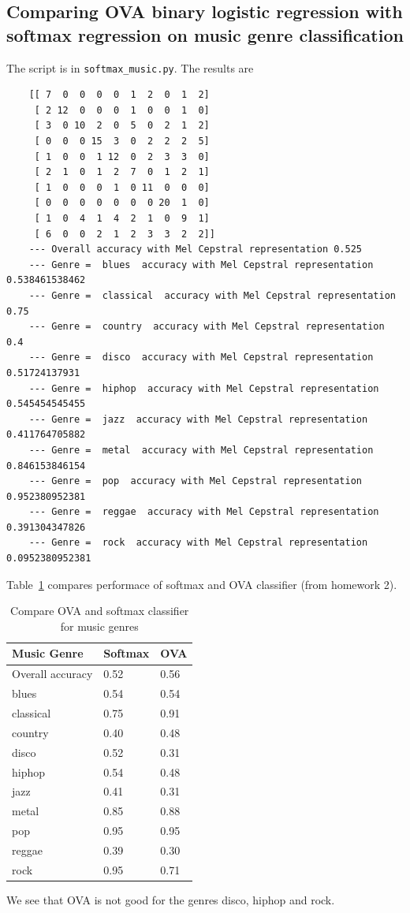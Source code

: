 \documentclass{article}
\begin{document}
\subsection{Comparing OVA binary logistic regression with softmax regression on music genre classification}
The script is in \verb|softmax_music.py|. The results are
\begin{lstlisting}
	[[ 7  0  0  0  0  1  2  0  1  2]
	 [ 2 12  0  0  0  1  0  0  1  0]
	 [ 3  0 10  2  0  5  0  2  1  2]
	 [ 0  0  0 15  3  0  2  2  2  5]
	 [ 1  0  0  1 12  0  2  3  3  0]
	 [ 2  1  0  1  2  7  0  1  2  1]
	 [ 1  0  0  0  1  0 11  0  0  0]
	 [ 0  0  0  0  0  0  0 20  1  0]
	 [ 1  0  4  1  4  2  1  0  9  1]
	 [ 6  0  0  2  1  2  3  3  2  2]]
	--- Overall accuracy with Mel Cepstral representation 0.525
	--- Genre =  blues  accuracy with Mel Cepstral representation 0.538461538462
	--- Genre =  classical  accuracy with Mel Cepstral representation 0.75
	--- Genre =  country  accuracy with Mel Cepstral representation 0.4
	--- Genre =  disco  accuracy with Mel Cepstral representation 0.51724137931
	--- Genre =  hiphop  accuracy with Mel Cepstral representation 0.545454545455
	--- Genre =  jazz  accuracy with Mel Cepstral representation 0.411764705882
	--- Genre =  metal  accuracy with Mel Cepstral representation 0.846153846154
	--- Genre =  pop  accuracy with Mel Cepstral representation 0.952380952381
	--- Genre =  reggae  accuracy with Mel Cepstral representation 0.391304347826
	--- Genre =  rock  accuracy with Mel Cepstral representation 0.0952380952381
\end{lstlisting}

Table~\ref{table:3.8ova} compares performace of softmax and OVA classifier (from homework 2).

\begin{table}[h]
\caption{Compare OVA and softmax classifier for music genres} \centering
\begin{tabular}{|l|l|l|}
\hline
Music Genre & Softmax & OVA\\
\hline\hline
Overall accuracy & 0.52 & 0.56 \\
blues  & 0.54 & 0.54 \\

classical  & 0.75 & 0.91\\

country  & 0.40 & 0.48 \\

disco  & 0.52 & 0.31 \\

hiphop  & 0.54 & 0.48 \\

jazz  & 0.41 & 0.31 \\

metal  & 0.85 & 0.88 \\

pop & 0.95 & 0.95 \\

reggae & 0.39 & 0.30 \\

rock & 0.95 & 0.71 \\
\hline
\end{tabular} \label{table:3.8ova}
\end{table}

We see that OVA is not good for the genres disco, hiphop and rock.
\end{document}
